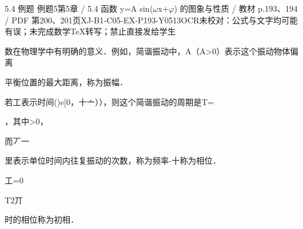 \begin{bankitem}{5.4 例题 例题5}{第5章 / 5.4 函数 y=A sin(\ensuremath{\omega}x+\ensuremath{\varphi}) 的图象与性质 / 教材 p.193、194 / PDF 第200、201页}{XJ-B1-C05-EX-P193-Y0513}{OCR未校对：公式与文字均可能有误；未完成数学TeX转写；禁止直接发给学生}
\begin{ocrdraft}
\par
数在物理学中有明确的意义．例如，简谐振动中，A（A>0）表示这个振动物体偏离
\par
平衡位置的最大距离，称为振幅．
\par
若工表示时间()e[0，十亠）），则这个简谐振动的周期是T=
\par
，其中>0，
\par
而丆一
\par
里表示单位时间内往复振动的次数，称为频率-十称为相位．
\par
工=0
\par
T2丌
\par
时的相位称为初相．
\end{ocrdraft}
\end{bankitem}
